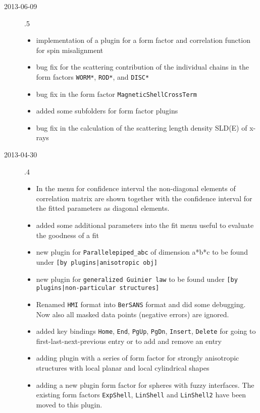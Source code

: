 \begin{description}
    \item[2013-06-09] .5
    \begin{itemize}
      \item implementation of a plugin for a form factor and correlation function for spin misalignment
      \item  bug fix for the scattering contribution of the individual chains in the form factors \texttt{WORM*}, \texttt{ROD*}, and \texttt{DISC*}
      \item  bug fix in the form factor \texttt{MagneticShellCrossTerm}
      \item added some subfolders for form factor plugins
      \item bug fix in the calculation of the scattering length density SLD(E) of x-rays
    \end{itemize}
    \item[2013-04-30] .4
    \begin{itemize}
      \item In the menu for confidence interval the non-diagonal elements of
            correlation matrix are shown together with the confidence interval
            for the fitted parameters as diagonal elements.
      \item added some additional parameters into the fit menu useful to
            evaluate the goodness of a fit
      \item new plugin for \texttt{Parallelepiped\_abc} of dimension a*b*c to be
            found under \texttt{[by plugins|anisotropic obj]}
      \item new plugin for \texttt{generalized Guinier law} to be found under
            \texttt{[by plugins|non-particular structures]}
      \item Renamed \texttt{HMI} format into \texttt{BerSANS} format and did some debugging.
            Now also all masked data points (negative errors) are ignored.
      \item added key bindings \texttt{Home}, \texttt{End}, \texttt{PgUp}, \texttt{PgDn}, \texttt{Insert},
            \texttt{Delete} for going to first-last-next-previous entry or to add and remove an entry
      \item adding plugin with a series of form factor for strongly anisotropic structures
            with local planar and local cylindrical shapes
      \item adding a new plugin form factor for spheres with fuzzy interfaces. The existing form factors
            \texttt{ExpShell}, \texttt{LinShell} and \texttt{LinShell2} have been moved to this plugin.

\end{itemize}
\end{description}
